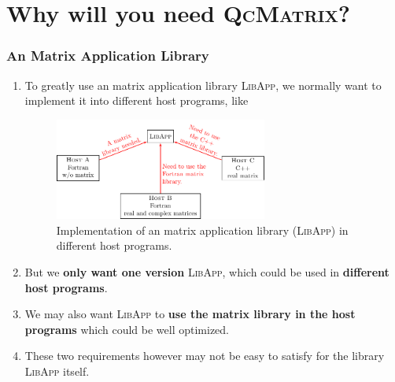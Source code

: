 \documentclass[10pt]{beamer}
\begin{document}
{{\section{Why will you need \textsc{QcMatrix}?}

\begin{frame}
  \frametitle<presentation>{An Matrix Application Library}
  \begin{enumerate}
    \item To greatly use an matrix application library \textsc{LibApp}, we normally
      want to implement it into different host programs, like
      \begin{figure}[htbp]
        \centering
        \includegraphics[width=7cm]{application_library.pdf}
        \caption{Implementation of an matrix application library (\textsc{LibApp})
          in different host programs.}
        \label{fig-application-library}
      \end{figure}
    \item But we \textbf{\color{red}only want one version} \textsc{LibApp}, which
      could be used in \textbf{\color{red}different host programs}.
    \item We may also want \textsc{LibApp} to \textbf{\color{red}use the matrix
      library in the host programs} which could be well optimized.
    \item These two requirements however may not be easy to satisfy for the library
      \textsc{LibApp} itself.
  \end{enumerate}
\end{frame}

}}
\end{document}
